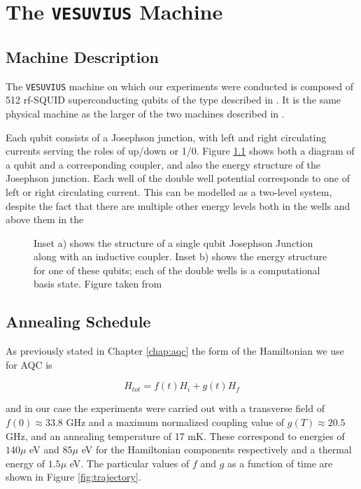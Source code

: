 \chapter{The \texttt{VESUVIUS} Machine}
\label{chap:machine}
\section{Machine Description}
The \texttt{VESUVIUS} machine on which our experiments were conducted is composed of 512 rf-SQUID superconducting qubits of the type described in \cite{qubit} \cite{dwave_nature}. It is the same physical machine as the larger of the two machines described in \cite{pudenz}.

Each qubit consists of a Josephson junction, with left and right circulating currents serving the roles of up/down or 1/0.  Figure \ref{fig:josephson} shows both a diagram of a qubit and a corresponding coupler, and also the energy structure of the Josephson junction.  Each well of the double well potential corresponds to one of left or right circulating current.  This can be modelled as a two-level system, despite the fact that there are multiple other energy levels both in the wells and above them in the 

\begin{figure}
	\caption[Josephson Junction and Energy Diagram]{Inset a) shows the structure of a single qubit Josephson Junction along with an inductive coupler.  Inset b) shows the energy structure for one of these qubits; each of the double wells is a computational basis state.  Figure taken from \cite{qubit}}
	\label{fig:josephson}
\end{figure}

\section{Annealing Schedule}
As previously stated in Chapter \ref{chap:aqc} the form of the Hamiltonian we use for AQC is

\begin{displaymath}
	H_{tot} = f(t)H_i + g(t)H_f
\end{displaymath}

and in our case the experiments were carried out with a transverse field of $f(0) \approx 33.8 $ GHz and a maximum normalized coupling value of $g(T) \approx 20.5$ GHz, and an annealing temperature of 17 mK.  These correspond to energies of $140 \mu$ eV and $85 \mu$ eV for the Hamiltonian components respectively and a thermal energy of $1.5 \mu$ eV.  The particular values of $f$ and $g$ as a function of time are shown in Figure \ref{fig:trajectory}.

